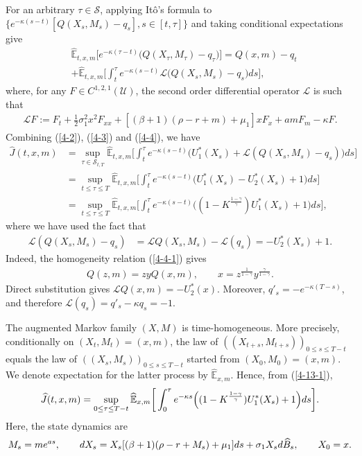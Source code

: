 \documentclass[a4paper,11pt]{amsart}
\numberwithin{equation}{section}
\newcommand{\blue}[1]{{\color{black}#1}}
\begin{document}
{\blue{For an arbitrary $\tau\in\mathcal S$, applying It\^o's formula to $\{e^{-\kappa(s-t)}[Q(X_s,M_s)-q_s],s\in[t,\tau]\}$ and taking conditional expectations give}
\begin{align*}
&\widehat{\mathbb{E}}_{t,x,m}\Big[e^{-\kappa(\tau-t)}\big(Q( X_{\tau}, M_{\tau})-q_\tau \big)\Big]= Q(x,m)-q_t\\&+
\widehat{ \mathbb{E}}_{t,x,m}\bigg[ \int_{t}^{\tau} e^{-\kappa(s-t)}\mathcal{L}\Big(Q( X_s,M_s)-q_s\Big) ds               \bigg ],
\end{align*}
where, for any $F \in C^{1,2,1}(\mathcal{U})$, the second order differential operator $\mathcal{L}$ is such that 
\begin{align*}
{\mathcal{L}}F:=F_t +\frac{1}{2}\sigma_1^2 x^2F_{xx}+[(\beta+1)(\rho-r+m)+\mu_1]xF_x  +a m F_m-\kappa F.
\end{align*}
Combining (\ref{4-2}), (\ref{4-3}) and (\ref{4-4}), we have
 \begin{align}\label{4-13-1}
\widehat{J}(t,x,m)&=\sup_{\tau\in\mathcal S_{t,T}} \widehat{\mathbb{E}}_{t,x,m}\bigg[\int_t^{\tau}e^{-\kappa(s-t)}\Big({U}^\ast_1(X_s)+\mathcal L(Q(X_s,M_s)-q_s)\Big)ds\bigg] \nonumber \\&
=\sup_{t\leq \tau \leq T}  \widehat{\mathbb{E}}_{t,x,m}\bigg[    \int_t^{\tau }  e^{-\kappa(s-t)}\Big( {U}^\ast_1(X_s) -U^\ast_2(X_s)+1 \Big)ds \bigg] \nonumber \\
&=\sup_{t\leq \tau \leq T}  \widehat{\mathbb{E}}_{t,x,m}\bigg[    \int_t^{\tau }  e^{-\kappa(s-t)}\Big( (1-K^{\frac{1-\gamma}{\gamma}}){U}^\ast_1(X_s) +1 \Big)ds \bigg], 
\end{align}
where we have used the fact that 
\begin{align*}
\mathcal{L}(Q(X_s,M_s)-q_s)&= \mathcal{L}Q(X_s,M_s) -\mathcal{L}(q_s)=-U^\ast_2(X_s)+1.
\end{align*}
\blue{Indeed, the homogeneity relation (\ref{4-4-1}) gives
\refstepcounter{equation}
\begin{align*}
Q(z,m)=zyQ(x,m),\qquad x=z^{\frac{1}{1-\gamma}}y^{\frac{\gamma}{1-\gamma}}.\tag{\theequation}\label{wxm}
\end{align*}
}
\blue{Direct substitution gives $\mathcal LQ(x,m)=-U_2^\ast(x)$. Moreover, $q'_s=-e^{-\kappa(T-s)}$, and therefore $\mathcal L(q_s)=q'_s-\kappa q_s=-1$.}


\blue{The augmented Markov family $(X,M)$ is time-homogeneous. More precisely, conditionally on $(X_t,M_t)=(x,m)$, the law of $((X_{t+s},M_{t+s}))_{0\leq s\leq T-t}$ equals the law of $((X_s,M_s))_{0\leq s\leq T-t}$ started from $(X_0,M_0)=(x,m)$. We denote expectation for the latter process by $\widehat{\mathbb E}_{x,m}$. Hence, from (\ref{4-13-1}),}
 \begin{align}\label{widehat{J}}
\widehat{J}(t,x,m)=\sup_{0 \leq \tau \leq T-t} \widehat{\mathbb{E}}_{x,m}\bigg[    \int_0^{\tau }  e^{-\kappa s}\Big( (1-K^{\frac{1-\gamma}{\gamma}}){U}^\ast_1(X_s) +1 \Big)ds \bigg]. 
\end{align}
\blue{Here, the state dynamics are}
\begin{align*}
\blue{M_s=me^{as},\qquad dX_s=X_s[(\beta+1)(\rho-r+M_s)+\mu_1]ds+\sigma_1X_sd\widehat B_s,\qquad X_0=x.}
\end{align*}



}
\end{document}

